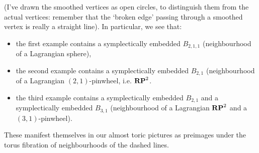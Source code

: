 \documentclass{article}
\begin{document}
\begin{Example}
\begin{center}
\end{center}
\begin{center}
\end{center}
(I've drawn the smoothed vertices as open circles, to distinguish
them from the actual vertices: remember that the `broken edge'
passing through a smoothed vertex is really a straight line). In
particular, we see that:
\begin{itemize}
\item the first example contains a symplectically embedded \(B_{2,1,1}\)
(neighbourhood of a Lagrangian sphere),
\item the second example contains a symplectically embedded \(B_{2,1}\)
(neighbourhood of a Lagrangian \((2,1)\)-pinwheel, i.e.
\(\mathbf{RP}^{2}\).
\item the third example contains a symplectically embedded \(B_{2,1}\)
and a symplectically embedded \(B_{3,1}\) (neighbourhood of a
Lagrangian \(\mathbf{RP}^{2}\) and a \((3,1)\)-pinwheel).
\end{itemize}
These manifest themselves in our almost toric pictures as preimages
under the torus fibration of neighbourhoods of the dashed lines.


\end{Example}
\end{document}
